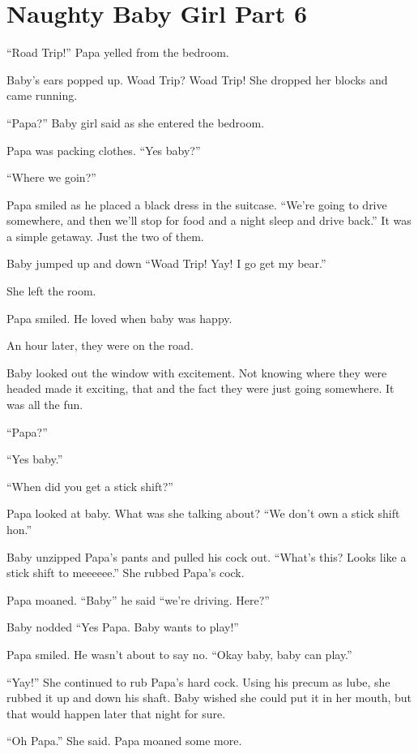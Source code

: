 \section{Naughty Baby Girl Part 6}

     “Road Trip!” Papa yelled from the bedroom.

     Baby’s ears popped up. Woad Trip? Woad Trip! She dropped her blocks and came running.

     “Papa?” Baby girl said as she entered the bedroom.

     Papa was packing clothes. “Yes baby?”

     “Where we goin?”

     Papa smiled as he placed a black dress in the suitcase. “We’re going to drive somewhere, and then we’ll stop for food and a night sleep and drive back.” It was a simple getaway. Just the two of them.

     Baby jumped up and down “Woad Trip! Yay! I go get my bear.”

     She left the room.

     Papa smiled. He loved when baby was happy.

     An hour later, they were on the road.

     Baby looked out the window with excitement. Not knowing where they were headed made it exciting, that and the fact they were just going somewhere. It was all the fun.

     “Papa?”

     “Yes baby.”

     “When did you get a stick shift?”

     Papa looked at baby. What was she talking about? “We don’t own a stick shift hon.”

     Baby unzipped Papa’s pants and pulled his cock out. “What’s this? Looks like a stick shift to meeeeee.” She rubbed Papa’s cock.

     Papa moaned. “Baby” he said “we’re driving. Here?”

     Baby nodded “Yes Papa. Baby wants to play!”

     Papa smiled. He wasn’t about to say no. “Okay baby, baby can play.”

     “Yay!” She continued to rub Papa’s hard cock. Using his precum as lube, she rubbed it up and down his shaft. Baby wished she could put it in her mouth, but that would happen later that night for sure.

     “Oh Papa.” She said. Papa moaned some more.

